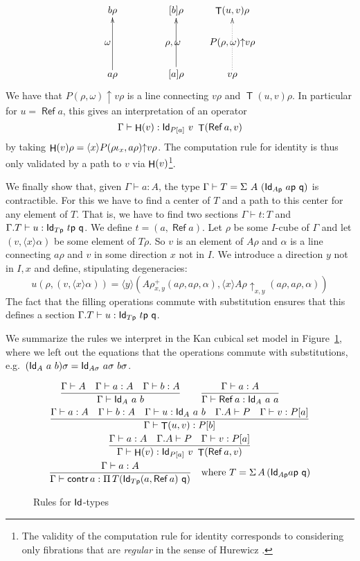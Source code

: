 \documentclass[10pt,a4paper]{article}
\DeclareMathOperator{\Ref}{\mathsf{Ref}}
\DeclareMathOperator{\Transp}{\mathsf{T}}
\DeclareMathOperator{\HH}{{\sf H}}
\newcommand{\Id}{{\sf Id}}
\newcommand{\pp}{{\sf p}}
\newcommand{\qq}{{\sf q}}
\newcommand{\rup}[1]{#1{\uparrow}}
\newcommand{\rupxy}[1]{#1{\uparrow_{x,y}}}
\newcommand{\bind}[2]{{\langle}#1{\rangle}#2}
\begin{document}
\[
\xymatrix@R=.6cm@C=.6cm{
b\rho                 &&[b]\rho                    &   \Transp(u,v)\rho                                 \\
\omega ~~~     &&\rho,\omega~~  &\rup{P(\rho,\omega)} v\rho \\
a\rho\ar[uu]      &&[a]\rho\ar[uu]       &   v\rho\ar@{.>}[uu]                        \\
}
\]
We have that $\rup{P(\rho,\omega)} v\rho$ is a line connecting
$v\rho$ and $\Transp(u,v)\rho$.  In particular for $u=\Ref a$, this gives
an interpretation of an operator
$$
\Gamma\vdash \HH(v):\Id_{P[a]}~v~\Transp(\Ref a,v)
$$
by taking $\HH(v)\rho = \bind{x}{\rup{P(\rho \iota_x,a\rho)} v\rho}$.  The
computation rule for identity is thus only validated by a path to $v$
via $\HH(v)$\footnote{The validity of the computation rule for
  identity corresponds to considering only fibrations that are {\em
    regular} in the sense of Hurewicz \cite{hurewicz}.}.


We finally show that, given $\Gamma\vdash a:A$, the type $\Gamma
\vdash T = \Sigma~A~(\Id_{A\pp}~a\pp~\qq)$ is contractible. For this
we have to find a center of $T$ and a path to this center for any
element of $T$.  That is, we have to find two sections $\Gamma\vdash
t:T$ and $\Gamma.T\vdash u:\Id_{T\pp}~t\pp~\qq$.  We define $t =
(a,\Ref a)$. Let $\rho$ be some $I$-cube of $\Gamma$ and let
$(v,\bind{x}{\alpha})$ be some element of $T\rho$. So $v$ is an
element of $A\rho$ and $\alpha$ is a line connecting $a\rho$ and $v$
in some direction $x$ not in $I$. We introduce a direction $y$ not in
$I,x$ and define, stipulating degeneracies:
$$
u(\rho,(v,\bind{x}{\alpha})) = \bind{y}{(A\rho^+ _{x,y}
  (a\rho,a\rho,\alpha),\bind{x}{\rupxy{A\rho}
    (a\rho,a\rho,\alpha)})}
$$
The fact that the filling operations commute with substitution ensures
that this defines a section $\Gamma.T\vdash u:\Id_{T\pp}~t\pp~\qq$.

We summarize the rules we interpret in the Kan cubical set model in
Figure~\ref{fig:idtype}, where we left out the equations that the
operations commute with substitutions, e.g.\ $(\Id_A~a~b) \sigma =
\Id_{A \sigma}~a\sigma~ b\sigma$.
\begin{figure}[t]
  \label{fig:idtype}
  \caption{Rules for $\Id$-types}
  \begin{gather*}
    \frac {\Gamma \vdash A \quad \Gamma \vdash a : A \quad \Gamma \vdash
      b : A} {\Gamma \vdash \Id_A~a~b} \qquad
    \frac {\Gamma \vdash a : A} {\Gamma\vdash \Ref a:\Id_A~a~a} \qquad
    \\
    \frac {\Gamma\vdash a:A \quad \Gamma\vdash b:A \quad \Gamma\vdash
      u:\Id_A~a~b \quad \Gamma.A \vdash P \quad \Gamma\vdash v:P[a]}
    {\Gamma\vdash \Transp(u,v):P[b]}
    \\
    \frac {\Gamma \vdash a : A \quad \Gamma.A \vdash P \quad \Gamma
      \vdash v : P [a]} {\Gamma \vdash \HH (v):\Id_{P[a]}~v~\Transp(\Ref
      a,v)}
    \\
    \frac {\Gamma \vdash a : A} {\Gamma \vdash \mathsf{contr}\, a :
      \Pi\, T (\Id_{T \pp} (a, \Ref a)~\qq) } \quad \text {where } T =
    \Sigma\,A\,(\Id_{A \pp} a \pp~ \qq)
  \end{gather*}
\end{figure}
\end{document}
